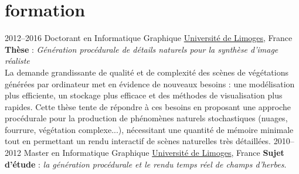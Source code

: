 \documentclass[]{friggeri-cv-a4} %
\begin{document}
\section{formation}

\begin{entrylist}
\entry
{2012--2016}
{Doctorant en Informatique Graphique}
{\href{http://www.unilim.fr/}{Université de Limoges}, France}
{\textbf{Thèse} : \emph{Génération procédurale de détails naturels pour la synthèse d'image réaliste} \\
La demande grandissante de qualité et de complexité des scènes de végétations générées par ordinateur met en évidence de nouveaux besoins : une modélisation plus efficiente, un stockage plus efficace et des méthodes de visualisation plus rapides.
Cette thèse tente de répondre à ces besoins en proposant une approche procédurale pour la production de phénomènes naturels stochastiques (nuages, fourrure, végétation complexe...), nécessitant une quantité de mémoire minimale tout en permettant un rendu interactif de scènes naturelles très détaillées.}
\entry
{2010--2012}
{Master en Informatique Graphique}
{\href{http://www.unilim.fr/}{Université de Limoges}, France}
{\textbf{Sujet d'étude} : \emph{la génération procédurale et le rendu temps réel de champs d'herbes}.}
\end{entrylist}


\end{document}
